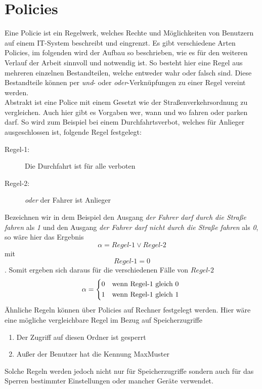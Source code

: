 \chapter{Policies} \label{Policies}
Eine Policie ist ein Regelwerk, welches Rechte und Möglichkeiten von Benutzern auf einem IT-System beschreibt und eingrenzt. Es gibt verschiedene Arten Policies, im folgenden wird der Aufbau so beschrieben, wie es für den weiteren Verlauf der Arbeit sinnvoll und notwendig ist. So besteht hier eine Regel aus mehreren einzelnen Bestandteilen, welche entweder wahr oder falsch sind. Diese Bestandteile können per \textit{und}- oder \textit{oder}-Verknüpfungen zu einer Regel vereint werden.\\
Abstrakt ist eine Police mit einem Gesetzt wie der Straßenverkehrsordnung zu vergleichen. Auch hier gibt es Vorgaben wer, wann und wo fahren oder parken darf. So wird zum Beispiel bei einem Durchfahrtsverbot, welches für Anlieger ausgeschlossen ist, folgende Regel festgelegt:
\begin{description}
	\item[Regel-1: ] Die Durchfahrt ist für alle verboten
	\item[Regel-2: ] \textit{oder} der Fahrer ist Anlieger
\end{description}
Bezeichnen wir in dem Beispiel den Ausgang \textit{der Fahrer darf durch die Straße fahren} als \textit{1} und den Ausgang \textit{der Fahrer darf nicht durch die Straße fahren} als \textit{0}, so wäre hier das Ergebnis
\begin{equation*}
	\alpha = Regel\text{-}1 \vee Regel\text{-}2
\end{equation*} mit 
\begin{equation*}
	Regel\text{-}1=0
\end{equation*}. Somit ergeben sich daraus für die verschiedenen Fälle von $Regel$-$2$
\[
	\alpha = 
		\begin{dcases*}
			0 & wenn Regel\text{-}1 gleich 0\\
			1 & wenn Regel\text{-}1 gleich 1
		\end{dcases*}
\]
Ähnliche Regeln können über Policies auf Rechner festgelegt werden. Hier wäre eine mögliche vergleichbare Regel im Bezug auf Speicherzugriffe
\begin{enumerate}
	\item Der Zugriff auf diesen Ordner ist gesperrt
	\item Außer der Benutzer hat die Kennung MaxMuster
\end{enumerate}
Solche Regeln werden jedoch nicht nur für Speicherzugriffe sondern auch für das Sperren bestimmter Einstellungen oder mancher Geräte verwendet.